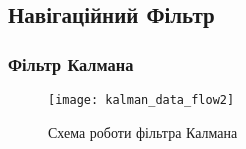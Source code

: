 \documentclass[ucs,compress]{beamer}    %
\begin{document}


\subsection{Навігаційний Фільтр}
\begin{frame} \frametitle{Фільтр Калмана} 
\begin{figure}[here]
\centering
\texttt{[image: kalman\_data\_flow2]}
\caption{Схема роботи фільтра Калмана}
\end{figure}
\end{frame}

\end{document}
